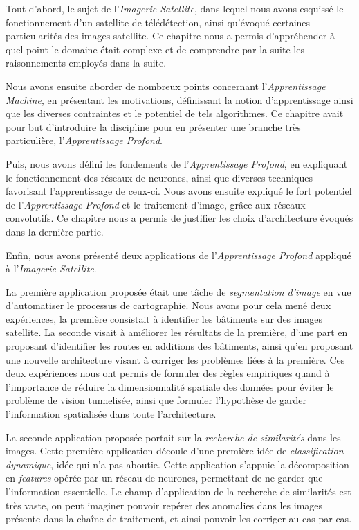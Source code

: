 \documentclass[a4paper, 11pt]{report}
\begin{document}
Tout d'abord, le sujet de l'\emph{Imagerie Satellite}, dans lequel nous avons esquissé le fonctionnement d'un satellite de télédétection, ainsi qu'évoqué certaines particularités des images satellite.
Ce chapitre nous a permis d'appréhender à quel point le domaine était complexe et de comprendre par la suite les raisonnements employés dans la suite.

Nous avons ensuite aborder de nombreux points concernant l'\emph{Apprentissage Machine}, en présentant les motivations, définissant la notion d'apprentissage ainsi que les diverses contraintes et le potentiel de tels algorithmes.
Ce chapitre avait pour but d'introduire la discipline pour en présenter une branche très particulière, l'\emph{Apprentissage Profond}.

Puis, nous avons défini les fondements de l'\emph{Apprentissage Profond}, en expliquant le fonctionnement des réseaux de neurones, ainsi que diverses techniques favorisant l'apprentissage de ceux-ci. Nous avons ensuite expliqué le fort potentiel de l'\emph{Apprentissage Profond} et le traitement d'image, grâce aux réseaux convolutifs.
Ce chapitre nous a permis de justifier les choix d'architecture évoqués dans la dernière partie.

Enfin, nous avons présenté deux applications de l'\emph{Apprentissage Profond} appliqué à l'\emph{Imagerie Satellite}.

La première application proposée était une tâche de \emph{segmentation d'image} en vue d'automatiser le processus de cartographie.
Nous avons pour cela mené deux expériences, la première consistait à identifier les bâtiments sur des images satellite. La seconde visait à améliorer les résultats de la première, d'une part en proposant d'identifier les routes en additions des bâtiments, ainsi qu'en proposant une nouvelle architecture visant à corriger les problèmes liées à la première.
Ces deux expériences nous ont permis de formuler des règles empiriques quand à l'importance de réduire la dimensionnalité spatiale des données pour éviter le problème de vision tunnelisée, ainsi que formuler l'hypothèse de garder l'information spatialisée dans toute l'architecture.

La seconde application proposée portait sur la \emph{recherche de similarités} dans les images.
Cette première application découle d'une première idée de \emph{classification dynamique}, idée qui n'a pas aboutie.
Cette application s'appuie la décomposition en \emph{features} opérée par un réseau de neurones, permettant de ne garder que l'information essentielle.
Le champ d'application de la recherche de similarités est très vaste,
on peut imaginer pouvoir repérer des anomalies dans les images présente dans la chaîne de traitement, et ainsi pouvoir les corriger au cas par cas.
\end{document}
